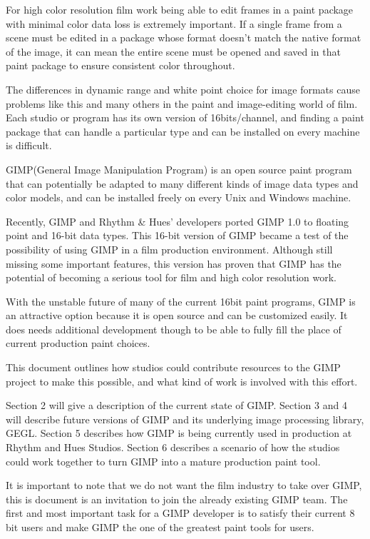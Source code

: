 
For high color resolution film work being able to edit frames in a paint
package with minimal color data loss is extremely important. If a single frame
from a scene must be edited in a package whose format doesn't match the native
format of the image, it can mean the entire scene must be opened and saved in
that paint package to ensure consistent color throughout.   

The differences in dynamic range and white point choice for image formats cause
problems like this and many others in the paint and image-editing world of film.
Each studio or program has its own version of 16bits/channel, and finding a
paint package that can handle a particular type and can be installed on every
machine is difficult.

GIMP(General Image Manipulation Program) is an open source paint program that
can potentially be adapted to many different kinds of image data types and
color models, and can be installed freely on every Unix and Windows machine. 

Recently, GIMP and Rhythm \& Hues' developers ported GIMP 1.0 to floating point
and 16-bit data types. This 16-bit version of GIMP became a test of the
possibility of using GIMP in a film production environment. Although still
missing some important features, this version has proven that GIMP has the
potential of becoming a serious tool for film and high color resolution work. 

With the unstable future of many of the current 16bit paint programs, GIMP is
an attractive option because it is open source and can be customized easily.
It does needs additional development though to be able to fully fill the place
of current production paint choices. 

This document outlines how studios could contribute resources to the GIMP
project to make this possible, and what kind of work is involved with this
effort.  

Section 2 will give a description of the current state of GIMP. Section 3
and 4 will describe future versions of GIMP and its underlying image processing
library, GEGL. Section 5 describes how GIMP is being currently used in
production at Rhythm and Hues Studios. Section 6 describes a scenario of how
the studios could work together to turn GIMP into a mature production paint
tool.

It is important to note that we do not want the film industry to take over GIMP, this is document is an invitation to join the already existing GIMP team. The first and most important task for a GIMP developer is to satisfy their current 8 bit users and make GIMP the one of the greatest paint tools for users.


